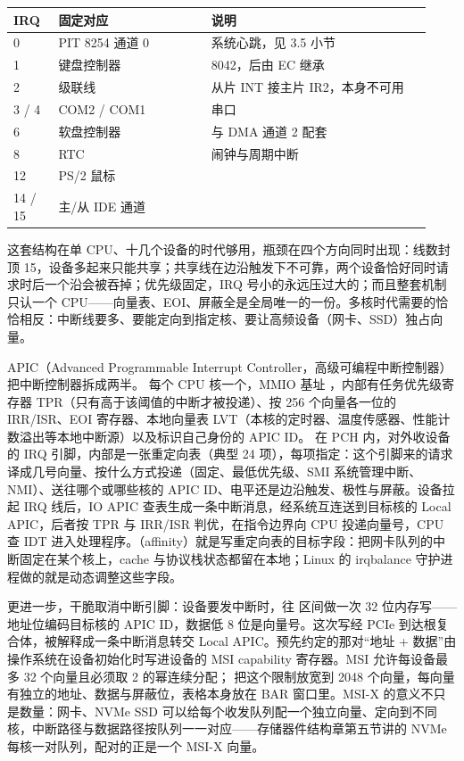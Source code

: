 \begin{longtable}{L{0.10\linewidth}L{0.34\linewidth}L{0.49\linewidth}}
\toprule
IRQ & 固定对应 & 说明 \\
 & PIT 8254 通道 0 & 系统心跳，见 3.5 小节 \\
1 & 键盘控制器 & 8042，后由 EC 继承 \\
2 & 级联线 & 从片 INT 接主片 IR2，本身不可用 \\
3 / 4 & COM2 / COM1 & 串口 \\
6 & 软盘控制器 & 与 DMA 通道 2 配套 \\
8 & RTC & 闹钟与周期中断 \\
12 & PS/2 鼠标 & \\
14 / 15 & 主/从 IDE 通道 & \\
\bottomrule
\end{longtable}

这套结构在单 CPU、十几个设备的时代够用，瓶颈在四个方向同时出现：线数封顶 15，设备多起来只能共享；共享线在边沿触发下不可靠，两个设备恰好同时请求时后一个沿会被吞掉；优先级固定，IRQ 号小的永远压过大的；而且整套机制只认一个 CPU——向量表、EOI、屏蔽全是全局唯一的一份。多核时代需要的恰恰相反：中断线要多、要能定向到指定核、要让高频设备（网卡、SSD）独占向量。

APIC（Advanced Programmable Interrupt Controller，高级可编程中断控制器）把中断控制器拆成两半。 每个 CPU 核一个，MMIO 基址 ，内部有任务优先级寄存器 TPR（只有高于该阈值的中断才被投递）、按 256 个向量各一位的 IRR/ISR、EOI 寄存器、本地向量表 LVT（本核的定时器、温度传感器、性能计数溢出等本地中断源）以及标识自己身份的 APIC ID。 在 PCH 内，对外收设备的 IRQ 引脚，内部是一张重定向表（典型 24 项），每项指定：这个引脚来的请求译成几号向量、按什么方式投递（固定、最低优先级、SMI 系统管理中断、NMI）、送往哪个或哪些核的 APIC ID、电平还是边沿触发、极性与屏蔽。设备拉起 IRQ 线后，IO APIC 查表生成一条中断消息，经系统互连送到目标核的 Local APIC，后者按 TPR 与 IRR/ISR 判优，在指令边界向 CPU 投递向量号，CPU 查 IDT 进入处理程序。（affinity）就是写重定向表的目标字段：把网卡队列的中断固定在某个核上，cache 与协议栈状态都留在本地；Linux 的 irqbalance 守护进程做的就是动态调整这些字段。

 更进一步，干脆取消中断引脚：设备要发中断时，往  区间做一次 32 位内存写——地址位编码目标核的 APIC ID，数据低 8 位是向量号。这次写经 PCIe 到达根复合体，被解释成一条中断消息转交 Local APIC。预先约定的那对“地址 + 数据”由操作系统在设备初始化时写进设备的 MSI capability 寄存器。MSI 允许每设备最多 32 个向量且必须取 2 的幂连续分配； 把这个限制放宽到 2048 个向量，每向量有独立的地址、数据与屏蔽位，表格本身放在 BAR 窗口里。MSI-X 的意义不只是数量：网卡、NVMe SSD 可以给每个收发队列配一个独立向量、定向到不同核，中断路径与数据路径按队列一一对应——存储器件结构章第五节讲的 NVMe 每核一对队列，配对的正是一个 MSI-X 向量。

